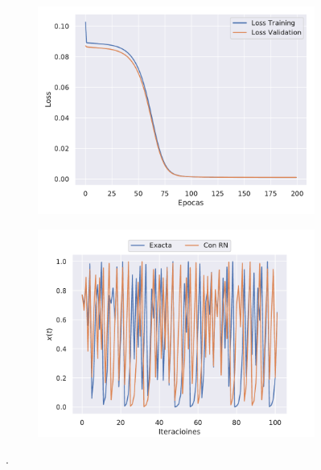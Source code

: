 \begin{figure}[h!]
    \centering
    \begin{subfigure}[h]{0.49\textwidth} 
        \includegraphics[width=\textwidth]{Figuras/ej3/Largo_Loss.pdf}
    \end{subfigure}       
    \begin{subfigure}[h]{0.49\textwidth} 
        \includegraphics[width=\textwidth]{Figuras/ej3/Largo_Evolucion.pdf}
    \end{subfigure}
    \caption{.} \label{fig:3_Resultados_Largo}
\end{figure}

